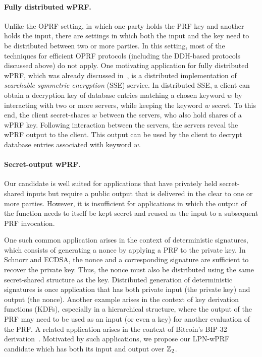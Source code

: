 \paragraph{Fully distributed wPRF.} Unlike the OPRF setting, in which one party holds the PRF key and another holds the input, there are settings in which both the input and the key need to be distributed between two or more parties. In this setting, most of the techniques for efficient OPRF protocols (including the DDH-based protocols discussed above) do not apply.
One motivating application for fully distributed wPRF, which was already discussed in~\cite{boneh2018-darkmatter}, is a distributed implementation of {\em searchable symmetric encryption} (SSE) service. In distributed SSE, a client can obtain a decryption key of database entries matching a chosen keyword $w$ by interacting with two or more servers, while keeping the keyword $w$ secret.  To this end, the client secret-shares $w$ between the servers, who also hold shares of a wPRF key. Following interaction between the servers, the servers reveal the wPRF output to the client. This output can be used by the client to decrypt database entries associated with keyword $w$.

\paragraph{Secret-output wPRF.} Our \ttwPRF candidate is well suited for applications that have privately held secret-shared inputs but require a public output that is delivered in the clear to one or more parties. However, it is insufficient for applications in which the output of the function needs to itself be kept secret and reused as the input to a subsequent PRF invocation.

One such common application arises in the context of deterministic signatures, which consists of generating a nonce by applying a PRF to the private key. In Schnorr and ECDSA, the nonce and a corresponding signature are sufficient to recover the private key. Thus, the nonce must also be distributed using the same secret-shared structure as the key. Distributed generation of deterministic signatures is once application that has both private input (the private key) and output (the nonce). Another example arises in the context of key derivation functions (KDFs), especially in a hierarchical structure, where the output of the PRF may need to be used as an input (or even a key) for another evaluation of the PRF. A related application arises in the context of Bitcoin's BIP-32 derivation~\cite{bitcoin_bip0032}. Motivated by such applications, we propose our LPN-wPRF candidate which has both its input and output over $\mathbb{Z}_2$.

